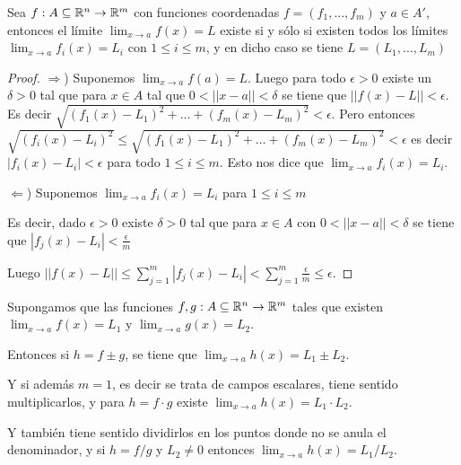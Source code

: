 \begin{theorem}
Sea $f:A \subseteq \mathbb{R}^n \to \mathbb{R}^m$ con funciones coordenadas $ f = (f_1, \ldots, f_m)$ y $a \in A'$, entonces el límite $ \lim_{x \to a} f(x) = L$ existe si y sólo si existen todos los límites $ \lim_{x \to a} f_i(x) = L_i$ con $ 1 \leq i \leq m$, y en dicho caso se tiene $ L = (L_1, \ldots, L_m)$
\end{theorem}

\begin{proof}
$\Rightarrow$) Suponemos $\lim_{x \to a} f(a) = L$. Luego para todo $\epsilon > 0$ existe un $\delta > 0$ tal que para $x \in A$ tal que $0 < ||x-a|| < \delta$ se tiene que $||f(x) - L|| < \epsilon$.  Es decir $\sqrt{ (f_1(x) - L_1)^2 + \ldots + (f_m(x) - L_m)^2} < \epsilon$.  Pero entonces $ \sqrt{ (f_i(x) - L_i)^2 } \leq \sqrt{ (f_1(x) - L_1)^2 + \ldots + (f_m(x) - L_m)^2} < \epsilon$ es decir $|f_i(x) - L_i| < \epsilon$ para todo $1 \leq i \leq m$.  Esto nos dice que $\lim_{x \to a} f_i(x) = L_i$.

$\Leftarrow$) Suponemos $ \lim_{x \to a} f_i(x) = L_i$ para $1 \leq i \leq m$

Es decir, dado $\epsilon > 0$ existe $\delta > 0$ tal que para $x \in A$ con $0 < ||x-a|| < \delta$ se tiene que $|f_j(x) - L_i| < \frac{\epsilon}{m}$

Luego $|| f(x) - L || \leq \sum_{j=1}^m |f_j(x) - L_i| < \sum_{j=1}^m \frac{\epsilon}{m} \leq \epsilon$.
\end{proof}

\begin{proposition}

Supongamos que las funciones $f, g : A \subseteq \mathbb{R}^n \to \mathbb{R}^m$ tales que existen $\lim_{x \to a} f(x) = L_1$ y $\lim_{x \to a} g(x) = L_2$.

Entonces si $h = f \pm g$, se tiene que $ \lim_{x \to a} h(x) = L_1 \pm L_2$.

Y si además $m=1$, es decir se trata de campos escalares, tiene sentido multiplicarlos, y para $h = f \cdot g$ existe $ \lim_{x \to a} h(x) = L_1 \cdot L_2$.

Y también tiene sentido dividirlos en los puntos donde no se anula el denominador, y si $h = f/g$ y $L_2 \neq 0$ entonces $\lim_{x \to a} h(x) = L_1/L_2$.
\end{proposition}

